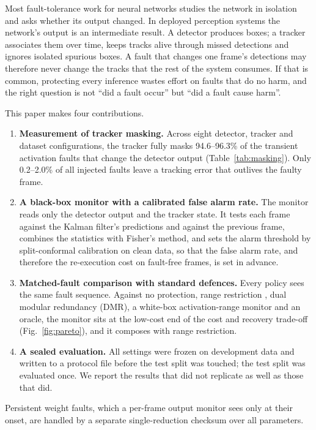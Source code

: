 \documentclass[11pt]{article}
\begin{document}
Most fault-tolerance work for neural networks studies the network in isolation and asks whether its output changed. In deployed perception systems the network's output is an intermediate result. A detector produces boxes; a tracker associates them over time, keeps tracks alive through missed detections and ignores isolated spurious boxes. A fault that changes one frame's detections may therefore never change the tracks that the rest of the system consumes. If that is common, protecting every inference wastes effort on faults that do no harm, and the right question is not ``did a fault occur'' but ``did a fault cause harm''.

This paper makes four contributions.
\begin{enumerate}
\item \textbf{Measurement of tracker masking.} Across eight detector, tracker and dataset configurations, the tracker fully masks 94.6--96.3\% of the transient activation faults that change the detector output (Table~\ref{tab:masking}). Only 0.2--2.0\% of all injected faults leave a tracking error that outlives the faulty frame.
\item \textbf{A black-box monitor with a calibrated false alarm rate.} The monitor reads only the detector output and the tracker state. It tests each frame against the Kalman filter's predictions and against the previous frame, combines the statistics with Fisher's method, and sets the alarm threshold by split-conformal calibration on clean data, so that the false alarm rate, and therefore the re-execution cost on fault-free frames, is set in advance.
\item \textbf{Matched-fault comparison with standard defences.} Every policy sees the same fault sequence. Against no protection, range restriction \citep{chen2021ranger}, dual modular redundancy (DMR), a white-box activation-range monitor and an oracle, the monitor sits at the low-cost end of the cost and recovery trade-off (Fig.~\ref{fig:pareto}), and it composes with range restriction.
\item \textbf{A sealed evaluation.} All settings were frozen on development data and written to a protocol file before the test split was touched; the test split was evaluated once. We report the results that did not replicate as well as those that did.
\end{enumerate}
Persistent weight faults, which a per-frame output monitor sees only at their onset, are handled by a separate single-reduction checksum over all parameters.
\end{document}
